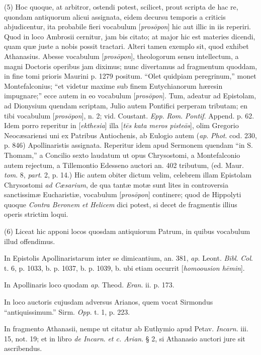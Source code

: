 (5) Hoc quoque, at arbitror, ostendi potest,
scilicet, prout scripta de hac re, quondam antiquorum alicui assignata,
eidem decursu temporis a criticis abjudicentur, ita probabile fieri
vocabulum [\emph{pros\={o}pon}] hic aut illic in iis reperiri. Quod
in loco Ambrosii cernitur, jam bis citato; at major hic est materies
dicendi, quam quæ juste a nobis possit tractari. Alteri tamen exemplo
sit, quod exhibet Athanasius. Abesse vocabulum [\emph{pros\={o}pon}],
theologorum sensu intellectum, a magni Doctoris operibus jam diximus;
nunc divertamus ad fragmentum quoddam, in fine tomi prioris Maurini p.
1279 positum. ``Olet quidpiam peregrinum,'' monet Montefalconius; ``et
videtur maxime sub finem Eutychianorum hæresin impugnare;'' ecce autem
in eo vocabulum [\emph{pros\={o}pon}]. Tum, adeatur ad Epistolam,
ad Dionysium quendam scriptam, Julio autem Pontifici perperam tributam; en tibi vocabulum [\emph{pros\={o}pon}], n. 2; vid.
Coustant. \emph{Epp}. \emph{Rom}. \emph{Pontif}. Append. p. 62. Idem
porro reperitur in [\emph{ekthesia}] illa [\emph{t\={e}s kata meros
piste\={o}s}], olim Gregorio Neocæsariensi uni ex Patribus
Antiochenis, ab Eulogio autem (\emph{ap}. \emph{Phot}. cod. 230, p.
846) Apollinaristis assignata. Reperitur idem apud Sermonem quendam ``in
S. Thomam,'' a Concilio sexto laudatum ut opus Chrysostomi, a
Montefalconio autem rejectum, a Tillemontio Edesseno auctori an. 402
tributum, (ed. Maur. \emph{tom}. 8, \emph{part}. 2, p. 14.) Hic autem
obiter dictum velim, celebrem illam Epistolam Chrysostomi \emph{ad Cæsarium},
de qua tantæ motæ sunt lites in controversia sanctissimæ Eucharistiæ,
vocabulum [\emph{pros\={o}pon}] continere; quod de Hippolyti quoque
\emph{Contra Beronem et Helicem} dici potest, si decet de fragmentis
illius operis strictim loqui.

(6) Liceat hic apponi locos quosdam antiquiorum
Patrum, in quibus vocabulum illud offendimus.

In Epistolis Apollinaristarum inter se
dimicantium, an. 381, \emph{ap}. Leont. \emph{Bibl}. \emph{Col}. t. 6,
p. 1033, b. p. 1037, b. p. 1039, b. ubi etiam occurrit [\emph{homoousion
h\={e}min}].

In Apollinaris loco quodam \emph{ap}. Theod. \emph{Eran}.
ii. p. 173.

In loco auctoris cujusdam adversus Arianos, quem
vocat Sirmondus ``antiquissimum.'' Sirm. \emph{Opp}. t. 1, p. 223.

In fragmento Athanasii, nempe ut citatur ab
Euthymio apud Petav. \emph{Incarn}. iii. 15, not. 19; et in libro \emph{de
Incarn}. \emph{et c. Arian}. § 2, si Athanasio auctori jure sit
ascribendus.

